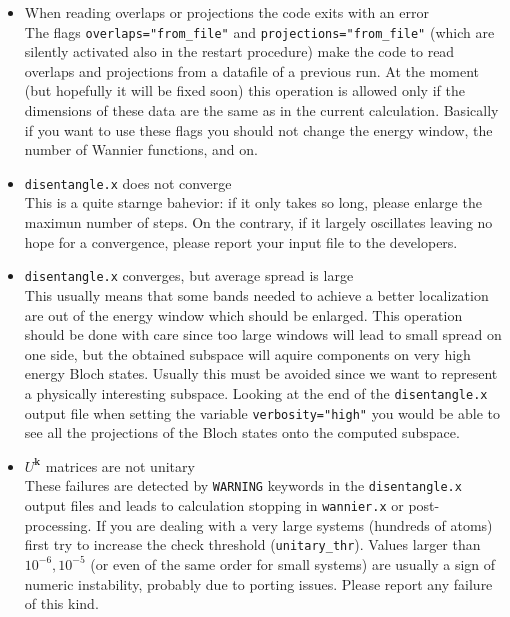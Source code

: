 \begin{itemize}
\item   {When reading overlaps or projections the code exits with an error } \\
        The flags {\tt overlaps="from\_file"} and {\tt projections="from\_file"}
        (which are silently activated also in the restart procedure) make the
        code to read overlaps and projections from a datafile of a previous run.
        At the moment (but hopefully it will be fixed soon) 
        this operation is allowed only if the dimensions of these data are the
        same as in the current calculation. Basically if you want to use these flags
        you should not change the energy window, the number of Wannier functions, and 
        on.

\item   {{\tt disentangle.x} does not converge } \\
        This is a quite starnge bahevior: if it only takes so long, please enlarge
        the maximun number of steps. On the contrary, if it largely oscillates
        leaving no hope for a convergence, please report your input file to the
        developers. 

\item   {{\tt disentangle.x} converges, but average spread is large } \\
        This usually means that some bands needed to achieve a better localization
        are out of the energy window which should be enlarged. This operation should
        be done with care since too large windows will lead to small spread on one
        side, but the obtained subspace will aquire components on very high energy
        Bloch states. Usually this must be avoided since we want to represent 
        a physically interesting subspace.
        Looking at the end of the {\tt disentangle.x} output file when setting the
        variable {\tt verbosity="high"} you would be able to see all the projections
        of the Bloch states onto the computed subspace.
       
\item   {$U^{\mathbf{k}}$ matrices are not unitary } \\
        These failures are detected by {\tt WARNING} keywords in the {\tt disentangle.x} 
        output files and leads to calculation stopping in {\tt wannier.x} or 
        post-processing. If you are dealing with a very large systems 
        (hundreds of atoms) first try to increase the check threshold ({\tt unitary\_thr}).
        Values larger than $10^{-6}, 10^{-5}$ (or even of the same order for small systems)
        are usually a sign of numeric instability, probably due to porting issues.
        Please report any failure of this kind.


\end{itemize}
